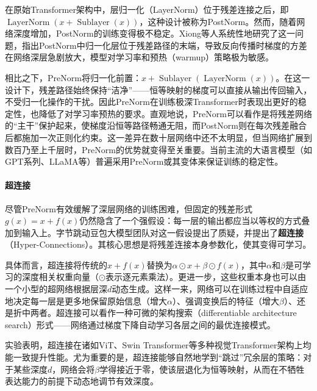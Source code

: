 在原始Transformer架构\cite{vaswani2023attentionneed}中，层归一化（LayerNorm）位于残差连接之后，即$\operatorname{LayerNorm}(x + \operatorname{Sublayer}(x))$，这种设计被称为PostNorm。然而，随着网络深度增加，PostNorm的训练变得极不稳定。Xiong等人\cite{xiong2020layernormalizationtransformerarchitecture}系统性地研究了这一问题，指出PostNorm中归一化层位于残差路径的末端，导致反向传播时梯度的方差在网络深层急剧放大，模型对学习率和预热（warmup）策略极为敏感。

相比之下，PreNorm将归一化前置：$x + \operatorname{Sublayer}(\operatorname{LayerNorm}(x))$。在这一设计下，残差路径始终保持“洁净”——恒等映射的梯度可以直接从输出传回输入，不受归一化操作的干扰。因此PreNorm在训练极深Transformer时表现出更好的稳定性，也降低了对学习率预热的要求\cite{xiong2020layernormalizationtransformerarchitecture}。直观地说，PreNorm可以看作是将残差网络的“主干”保护起来，使梯度沿恒等路径畅通无阻，而PostNorm则在每次残差融合后都施加一次正则化约束。这一差异在数十层网络中还不太明显，但当网络扩展到数百乃至上千层时，PreNorm的优势就变得至关重要。当前主流的大语言模型（如GPT系列、LLaMA等）普遍采用PreNorm或其变体来保证训练的稳定性\cite{touvron2023llamaopenefficientfoundation}。

\paragraph{超连接}

尽管PreNorm有效缓解了深层网络的训练困难，但固定的残差形式$g(x) = x + f(x)$仍然隐含了一个强假设：每一层的输出都应当以等权的方式叠加到输入上。字节跳动豆包大模型团队对这一假设提出了质疑，并提出了\textbf{超连接}（Hyper-Connections）\cite{zhu2025hyperconnections}。其核心思想是将残差连接本身参数化，使其变得可学习。

具体而言，超连接将传统的$x + f(x)$替换为$\alpha \odot x + \beta \odot f(x)$，其中$\alpha$和$\beta$是可学习的深度相关权重向量（$\odot$表示逐元素乘法）。更进一步，这些权重本身也可以由一个小型的超网络根据层深$d$动态生成。这样一来，网络可以在训练过程中自适应地决定每一层是更多地保留原始信息（增大$\alpha$）、强调变换后的特征（增大$\beta$）、还是折中两者。超连接可以看作一种可微的架构搜索（differentiable architecture search）形式——网络通过梯度下降自动学习各层之间的最优连接模式。

实验表明，超连接在诸如ViT、Swin Transformer等多种视觉Transformer架构上均能一致提升性能\cite{zhu2025hyperconnections}。尤为重要的是，超连接能够自然地学到“跳过”冗余层的策略：对于某些深度$d$，网络会将$\beta$学得接近于零，使该层退化为恒等映射，从而在不牺牲表达能力的前提下动态地调节有效深度。

